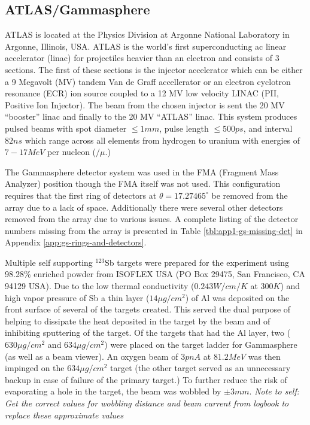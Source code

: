 \subsection{ATLAS/Gammasphere}
\label{ssec:exp-pr-details-gs}
ATLAS is located at the Physics Division at Argonne National Laboratory in Argonne, Illinois, USA. ATLAS is the world's first superconducting ac linear accelerator (linac) for projectiles heavier than an electron and consists of 3 sections. The first of these sections is the injector accelerator which can be either a 9 Megavolt (MV) tandem Van de Graff accellerator or an electron cyclotron resonance (ECR) ion source coupled to a 12 MV low velocity LINAC (PII, Positive Ion Injector). The beam from the chosen injector is sent the 20 MV ``booster'' linac and finally to the 20 MV ``ATLAS'' linac. This system produces pulsed beams with spot diameter $\leq1mm$, pulse length $\leq500ps$, and interval $82ns$ which range across all elements from hydrogen to uranium with energies of $7-17MeV$ per nucleon ($/\mu{}$.)

The Gammasphere detector system was used in the FMA (Fragment Mass Analyzer) position though the FMA itself was not used. This configuration requires that the first ring of detectors at $\theta{}=17.27465^{\circ}$ be removed from the array due to a lack of space. Additionally there were several other detectors removed from the array due to various issues. A complete listing of the detector numbers missing from the array is presented in Table \ref{tbl:app1-gs-missing-det} in Appendix \ref{app:gs-rings-and-detectors}.

Multiple self supporting $^{123}$Sb targets were prepared for the experiment using 98.28\% enriched powder from ISOFLEX USA (PO Box 29475, San Francisco, CA 94129 USA)\cite{sbTargets}. Due to the low thermal conductivity ($0.243W/cm/K$ at $300K$\cite{thermalCond}) and high vapor pressure\cite{sbPartialP,sbTargets} of Sb a thin layer ($14\mu{}g/cm^2$) of Al was deposited on the front surface of several of the targets created. This served the dual purpose of helping to dissipate the heat deposited in the target by the beam and of inhibiting sputtering of the target. Of the targets that had the Al layer, two ($630\mu{}g/cm^2$ and $634\mu{}g/cm^2$) were placed on the target ladder for Gammasphere (as well as a beam viewer). An oxygen beam of $3pnA$ at $81.2MeV$ was then impinged on the $634\mu{}g/cm^2$ target (the other target served as an unnecessary backup in case of failure of the primary target.) To further reduce the risk of evaporating a hole in the target, the beam was wobbled by $\pm{}3mm$. \emph{Note to self: Get the correct values for wobbling distance and beam current from logbook to replace these approximate values}

